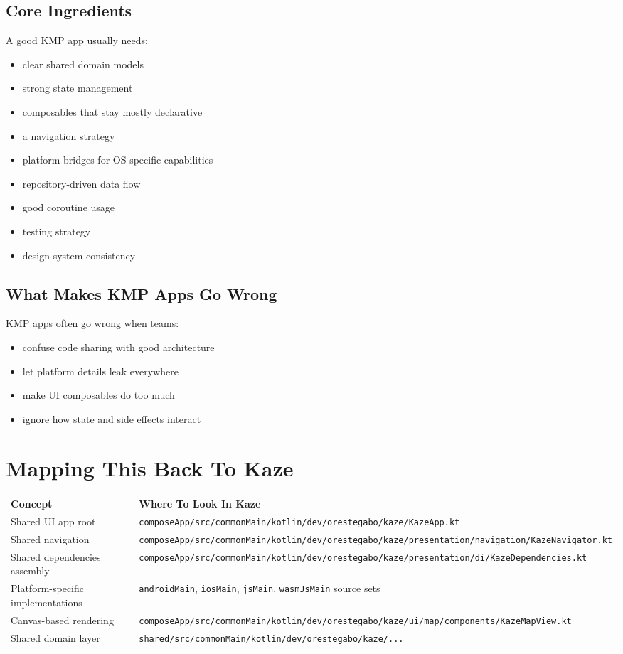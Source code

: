 \documentclass[11pt,a4paper]{article}
\begin{document}
\subsection{Core Ingredients}

A good KMP app usually needs:
\begin{itemize}
    \item clear shared domain models
    \item strong state management
    \item composables that stay mostly declarative
    \item a navigation strategy
    \item platform bridges for OS-specific capabilities
    \item repository-driven data flow
    \item good coroutine usage
    \item testing strategy
    \item design-system consistency
\end{itemize}

\subsection{What Makes KMP Apps Go Wrong}

KMP apps often go wrong when teams:
\begin{itemize}
    \item confuse code sharing with good architecture
    \item let platform details leak everywhere
    \item make UI composables do too much
    \item ignore how state and side effects interact
\end{itemize}

\section{Mapping This Back To Kaze}

\begin{longtable}{p{} p{}}
\textbf{Concept} & \textbf{Where To Look In Kaze} \\
Shared UI app root & \texttt{composeApp/src/commonMain/kotlin/dev/orestegabo/kaze/KazeApp.kt} \\
Shared navigation & \texttt{composeApp/src/commonMain/kotlin/dev/orestegabo/kaze/presentation/navigation/KazeNavigator.kt} \\
Shared dependencies assembly & \texttt{composeApp/src/commonMain/kotlin/dev/orestegabo/kaze/presentation/di/KazeDependencies.kt} \\
Platform-specific implementations & \texttt{androidMain}, \texttt{iosMain}, \texttt{jsMain}, \texttt{wasmJsMain} source sets \\
Canvas-based rendering & \texttt{composeApp/src/commonMain/kotlin/dev/orestegabo/kaze/ui/map/components/KazeMapView.kt} \\
Shared domain layer & \texttt{shared/src/commonMain/kotlin/dev/orestegabo/kaze/...} \\
\end{longtable}
\end{document}
